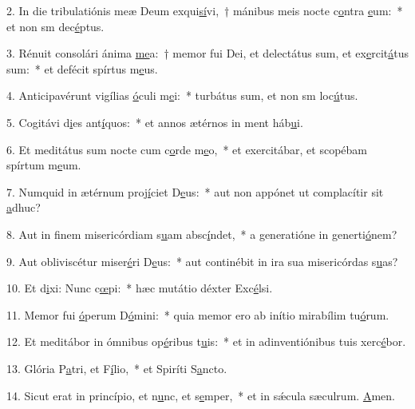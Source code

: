 2. In die tribulatiónis meæ Deum exqui\uline{sí}vi,~† mánibus meis nocte c\uline{o}ntra \uline{e}um:~* et non sm dec\uline{é}ptus.\par 
3. Rénuit consolári ánima \uline{me}a:~† memor fui Dei, et delectátus sum, et ex\uline{e}rcit\uline{á}tus sum:~* et defécit spírtus m\uline{e}us.\par 
4. Anticipavérunt vigílias \uline{ó}culi m\uline{e}i:~* turbátus sum, et non sm loc\uline{ú}tus.\par 
5. Cogitávi d\uline{i}es ant\uline{í}quos:~* et annos ætérnos in ment háb\uline{u}i.\par 
6. Et meditátus sum nocte cum c\uline{o}rde m\uline{e}o,~* et exercitábar, et scopébam spírtum m\uline{e}um.\par 
7. Numquid in ætérnum proj\uline{í}ciet D\uline{e}us:~* aut non appónet ut complacítir sit \uline{a}dhuc?\par 
8. Aut in finem misericórdiam s\uline{u}am absc\uline{í}ndet,~* a generatióne in generti\uline{ó}nem?\par 
9. Aut obliviscétur miser\uline{é}ri D\uline{e}us:~* aut continébit in ira sua misericórdas s\uline{u}as?\par 
10. Et d\uline{i}xi: Nunc c\uline{œ}pi:~* hæc mutátio déxter Exc\uline{é}lsi.\par 
11. Memor fui \uline{ó}perum D\uline{ó}mini:~* quia memor ero ab inítio mirabílim tu\uline{ó}rum.\par 
12. Et meditábor in ómnibus op\uline{é}ribus t\uline{u}is:~* et in adinventiónibus tuis xerc\uline{é}bor.\par 
13. Glória P\uline{a}tri, et F\uline{í}lio,~* et Spiríti S\uline{a}ncto.\par 
14. Sicut erat in princípio, et n\uline{u}nc, et s\uline{e}mper,~* et in sǽcula sæculrum. \uline{A}men.\par 
